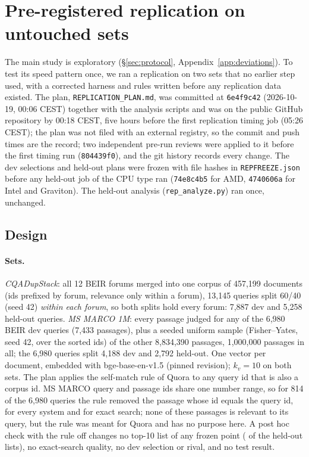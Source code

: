\section{Pre-registered replication on untouched sets}\label{sec:replication}

The main study is exploratory (\S\ref{sec:protocol}, Appendix~\ref{app:deviations}). To test its speed pattern once, we
ran a replication on two sets that no earlier step used, with a corrected harness and rules written before any
replication data existed. The plan, \texttt{REPLICATION\_PLAN.md}, was committed at \texttt{6e4f9c42} (2026-10-19, 00:06
CEST) together with the analysis scripts and was on the public GitHub repository by 00:18 CEST, five hours before the
first replication timing job (05:26 CEST); the plan was not filed with an external registry, so the commit and push
times are the record; two independent pre-run reviews were applied to it before the first timing run
(\texttt{804439f0}), and the git history records every change. The dev selections and held-out plans were frozen with
file hashes in \texttt{REPFREEZE.json} before any held-out job of the CPU type ran (\texttt{74e8c4b5} for AMD,
\texttt{4740606a} for Intel and Graviton). The held-out analysis (\texttt{rep\_analyze.py}) ran once, unchanged.

\subsection{Design}

\paragraph{Sets.} \emph{CQADupStack}: all 12 BEIR forums merged into one corpus of 457,199 documents (ids prefixed by
forum, relevance only within a forum), 13,145 queries split 60/40 (seed 42) \emph{within each forum}, so both splits hold
every forum: 7,887 dev and 5,258 held-out queries. \emph{MS MARCO 1M}: every passage judged for any of the 6,980 BEIR dev
queries (7,433 passages), plus a seeded uniform sample (Fisher--Yates, seed 42, over the sorted ids) of the other
8,834,390 passages, 1,000,000 passages in all; the 6,980 queries split 4,188 dev and 2,792 held-out. One vector per
document, embedded with bge-base-en-v1.5 (pinned revision); $k_v = 10$ on both sets. The plan applies the self-match rule
of Quora to any query id that is also a corpus id. MS MARCO query and passage ids share one number range, so for 814 of
the 6,980 queries the rule removed the passage whose id equals the query id, for every system and for exact search; none
of these passages is relevant to its query, but the rule was meant for Quora and has no purpose here. A post hoc check
with the rule off changes no top-10 list of any frozen point ( of the held-out lists), no exact-search
quality, no dev selection or rival, and no test result.

